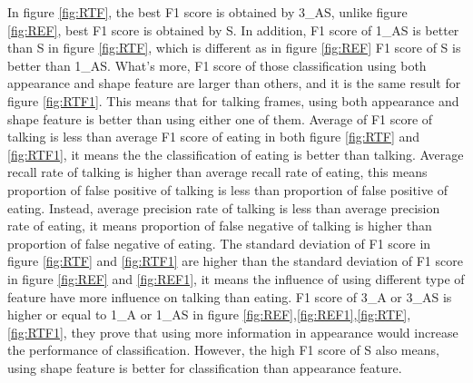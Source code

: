 \newline
In figure \ref{fig:RTF}, the best F1 score is obtained by 3\_AS, unlike figure \ref{fig:REF}, best F1 score is obtained by S. In addition, F1 score of 1\_AS  is better than S in figure \ref{fig:RTF}, which is different as in figure \ref{fig:REF} F1 score of S is better than 1\_AS. What's more, F1 score of those classification using both appearance and shape feature are larger than others, and it is the same result for figure \ref{fig:RTF1}. This means that for talking frames, using both appearance and shape feature is better than using either one of them. Average of F1 score of talking is less than average F1 score of eating in both figure \ref{fig:RTF} and \ref{fig:RTF1}, it means the the classification of eating is better than talking. Average recall rate of talking is higher than average recall rate of  eating, this means proportion of false positive of talking is less than proportion of false positive of eating. Instead, average precision rate of talking is less than average precision rate of eating, it means proportion of false negative of talking is higher than proportion of false negative of eating. The standard deviation of F1 score in figure \ref{fig:RTF} and \ref{fig:RTF1} are higher than the standard deviation of F1 score in figure \ref{fig:REF} and \ref{fig:REF1}, it means the influence of using different type of feature have more influence on talking than eating. F1 score of 3\_A or 3\_AS is higher or equal to 1\_A or 1\_AS in figure \ref{fig:REF},\ref{fig:REF1},\ref{fig:RTF},\ref{fig:RTF1}, they prove that using  more information in appearance would increase the performance of classification. However, the high F1 score of S also means, using shape feature is better for classification than appearance feature.
